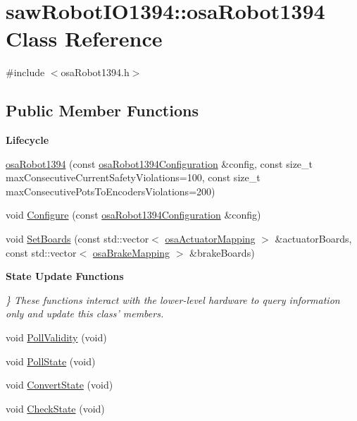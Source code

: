 \hypertarget{classsaw_robot_i_o1394_1_1osa_robot1394}{\section{saw\-Robot\-I\-O1394\-:\-:osa\-Robot1394 Class Reference}
\label{classsaw_robot_i_o1394_1_1osa_robot1394}
}


{\ttfamily \#include $<$osa\-Robot1394.\-h$>$}

\subsection*{Public Member Functions}
\begin{Indent}{\bf Lifecycle}\par
\begin{DoxyCompactItemize}
\item 
\hyperlink{classsaw_robot_i_o1394_1_1osa_robot1394_ae23ef9fee501ca144aee464b0efa38b7}{osa\-Robot1394} (const \hyperlink{structsaw_robot_i_o1394_1_1osa_robot1394_configuration}{osa\-Robot1394\-Configuration} \&config, const size\-\_\-t max\-Consecutive\-Current\-Safety\-Violations=100, const size\-\_\-t max\-Consecutive\-Pots\-To\-Encoders\-Violations=200)
\item 
void \hyperlink{classsaw_robot_i_o1394_1_1osa_robot1394_a4015586b6aefc4e115efcd8c5a3ffdcf}{Configure} (const \hyperlink{structsaw_robot_i_o1394_1_1osa_robot1394_configuration}{osa\-Robot1394\-Configuration} \&config)
\item 
void \hyperlink{classsaw_robot_i_o1394_1_1osa_robot1394_ace9682c3c6c17de917b73b205168c431}{Set\-Boards} (const std\-::vector$<$ \hyperlink{structsaw_robot_i_o1394_1_1osa_actuator_mapping}{osa\-Actuator\-Mapping} $>$ \&actuator\-Boards, const std\-::vector$<$ \hyperlink{structsaw_robot_i_o1394_1_1osa_brake_mapping}{osa\-Brake\-Mapping} $>$ \&brake\-Boards)
\end{DoxyCompactItemize}
\end{Indent}
\begin{Indent}{\bf State Update Functions}\par
{\em \} These functions interact with the lower-\/level hardware to query information only and update this class' members. }\begin{DoxyCompactItemize}
\item 
void \hyperlink{classsaw_robot_i_o1394_1_1osa_robot1394_a01557c89c207af1bd203f2d890af5057}{Poll\-Validity} (void)
\item 
void \hyperlink{classsaw_robot_i_o1394_1_1osa_robot1394_ac57a268f5fd855fb58906514e3beb9cd}{Poll\-State} (void)
\item 
void \hyperlink{classsaw_robot_i_o1394_1_1osa_robot1394_a4dbd546337cf55fe1edd85451878f025}{Convert\-State} (void)
\item 
void \hyperlink{classsaw_robot_i_o1394_1_1osa_robot1394_a16946ac9eca7aecf40da51ac139f9346}{Check\-State} (void)
\end{DoxyCompactItemize}
\end{Indent}
